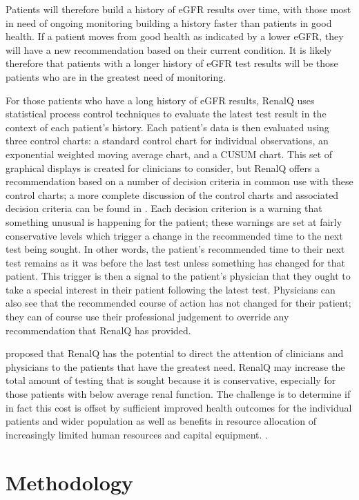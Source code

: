 Patients will therefore build a history of eGFR results over time, with those most in need of ongoing monitoring building a history faster than patients in good health. If a patient moves from good health as indicated by a lower eGFR, they will have a new recommendation based on their current condition. It is likely therefore that patients with a longer history of eGFR test results will be those patients who are in the greatest need of monitoring.

For those patients who have a long history of eGFR results, RenalQ uses statistical process control techniques to evaluate the latest test result in the context of each patient's history. Each patient's data is then evaluated using three control charts: a standard control chart for individual observations, an exponential weighted moving average chart, and a CUSUM chart. This set of graphical displays is created for clinicians to consider, but RenalQ offers a recommendation based on a number of decision criteria in common use with these control charts; a more complete discussion of the control charts and associated decision criteria can be found in \citet{GodfreyEtAl2014KidneyPaper}. Each decision criterion is a warning that something unusual is happening for the patient; these warnings are set at fairly conservative levels which trigger a change in the recommended time to the next test being sought. In other words, the patient's recommended time to their next test remains as it was before the last test unless something has changed for that patient. This trigger is then a signal to the patient's physician that they ought to take a special interest in their patient following the latest test. Physicians can also see that the recommended course of action has not changed for their patient; they can of course use their professional judgement to override any recommendation that RenalQ has provided.

\citet{GodfreyEtAl2014KidneyPaper}  proposed that RenalQ has the potential to direct the attention of clinicians and physicians to the patients that have the greatest need. RenalQ may increase the total amount of testing that is sought because it is conservative, especially for those patients with below average renal function. The challenge is to determine if in fact this cost is offset by sufficient improved health outcomes for the individual patients and wider population as well as benefits in resource allocation of increasingly limited human resources and capital equipment. .

\section{Methodology} \label{Methodology} 

